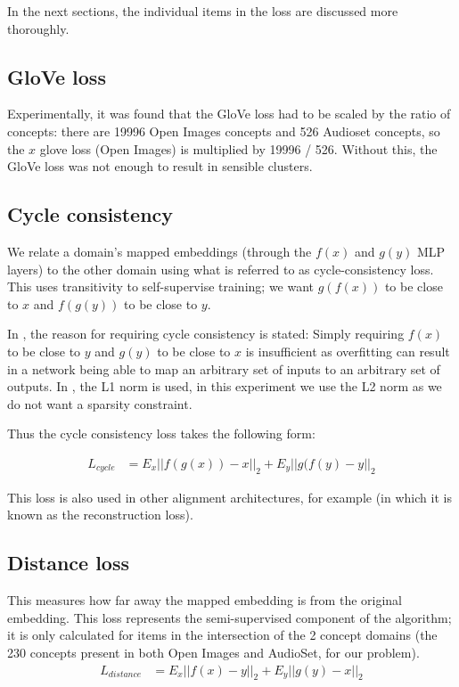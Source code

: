 In the next sections, the individual items in the loss are discussed more thoroughly.

\subsection{GloVe loss}

Experimentally, it was found that the GloVe loss had to be scaled by the ratio of concepts: there are 19996 Open Images concepts and 526 Audioset concepts, so the $x$ glove loss (Open Images) is multiplied by 19996 / 526. Without this, the GloVe loss was not enough to result in sensible clusters. 


\subsection{Cycle consistency}

We relate a domain's mapped embeddings (through the $f(x)$ and $g(y)$ MLP layers) to the other domain using what is referred to as cycle-consistency loss. This uses transitivity to self-supervise training; we want $g(f(x))$ to be close to $x$ and $f(g(y))$ to be close to $y$. 

In \cite{CycleGAN}, the reason for requiring cycle consistency is stated: Simply requiring $f(x)$ to be close to $y$ and $g(y)$ to be close to $x$ is insufficient as overfitting can result in a network being able to map an arbitrary set of inputs to an arbitrary set of outputs. In \cite{CycleGAN}, the L1 norm is used, in this experiment we use the L2 norm as we do not want a sparsity constraint. 

Thus the cycle consistency loss takes the following form:

\begin{equation}
\begin{split}
L_{cycle} &= E_x ||f(g(x)) - x||_2 + E_y ||g(f(y) - y||_2
\end{split}
\end{equation}

This loss is also used in other alignment architectures, for example \cite{magan} (in which it is known as the reconstruction loss). 


\subsection{Distance loss}

This measures how far away the mapped embedding is from the original embedding. This loss represents the semi-supervised component of the algorithm; it is only calculated for items in the intersection of the 2 concept domains (the 230 concepts present in both Open Images and AudioSet, for our problem). 
\begin{equation}
\begin{split}
L_{distance} &= E_x||f(x) - y||_2 + E_y||g(y) - x||_2
\end{split}
\end{equation}

